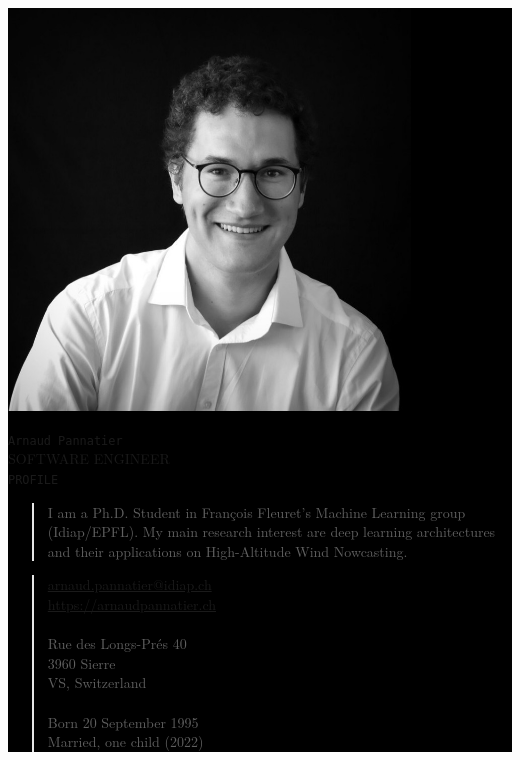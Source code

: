 \documentclass{article}
\begin{document}
\noindent\colorbox{black}{
    \begin{minipage}[t][0.98\textheight][t]{0.33\textwidth}
        \centering  \color{white} \bfseries
        \vspace{1cm}
        \includegraphics[width=0.8\textwidth]{arnaud-cv}
        \vspace{0.5cm}

        \Huge \texttt{Arnaud Pannatier} \\
        \vspace{0.4cm}
        \normalsize  { \color{dimmedwhite} SOFTWARE ENGINEER } \\
        \vspace{1.4cm}
        \Large \texttt{PROFILE} \\

        \small \color{dimmedwhite} \justifying
        \vspace{0.4cm}
        \begin{quotation}
            \color{dimmedwhite}
            \noindent I am a Ph.D. Student in François Fleuret's Machine Learning group (Idiap/EPFL). My main research interest are deep learning architectures and their applications on High-Altitude Wind Nowcasting.
        \end{quotation}

        \vfill
        \begin{quotation}
            \noindent
            \href{mailto:arnaud.pannatier@idiap.ch}{arnaud.pannatier@idiap.ch}\\
            \href{https://arnaudpannatier.ch}{https://arnaudpannatier.ch}\\
            \\
            \noindent
            Rue des Longs-Prés 40 \\
            3960 Sierre \\
            VS, Switzerland \\
            \\
            \noindent Born 20 September 1995 \\
            Married, one child (2022) \\


\end{quotation}
\end{minipage}}
\end{document}
